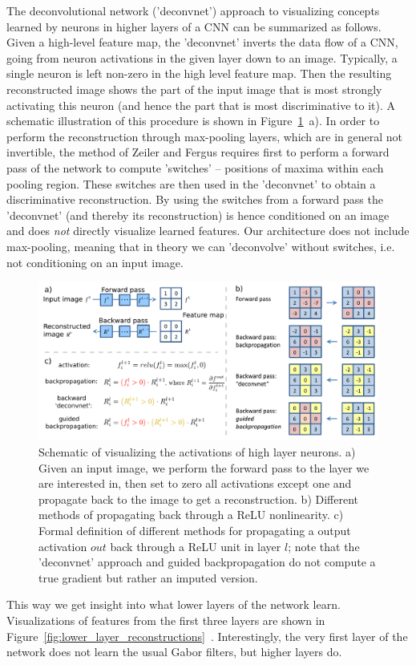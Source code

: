 \documentclass{article} %
\begin{document}
The deconvolutional network ('deconvnet') approach to visualizing concepts learned by neurons in higher layers of a CNN can be summarized as follows. Given a high-level feature map, the 'deconvnet' inverts the data flow of a CNN, going from neuron activations in the given layer down to an image. Typically, a single neuron is left non-zero in the high level feature map. Then the resulting reconstructed image shows the part of the input image that is most strongly activating this neuron (and hence the part that is most discriminative to it). A schematic illustration of this procedure is shown in Figure~\ref{fig:scheme_deconv}~a).
%
In order to perform the reconstruction through max-pooling layers, which are in general not invertible, the method of Zeiler and Fergus requires first to perform a forward pass of the network to compute 'switches' -- positions of maxima within each pooling region. These switches are then used in the 'deconvnet' to obtain a discriminative reconstruction. By using the switches from a forward pass the 'deconvnet' (and thereby its reconstruction) is hence conditioned on an image and does \emph{not} directly visualize learned features. Our architecture does not include max-pooling, meaning that in theory we can 'deconvolve' without switches, i.e. not conditioning on an input image. 
\begin{figure}[h!]
\begin{center}
\includegraphics[width=.7\textwidth]{scheme_recons.pdf}
\end{center}
\caption{Schematic of visualizing the activations of high layer
  neurons. a) Given an input image, we perform the forward pass to the
  layer we are interested in, then set to zero all activations except
  one and propagate back to the image to get a reconstruction. b)
  Different methods of propagating back through a ReLU
  nonlinearity. c) Formal definition of different methods for
  propagating a output activation $out$ back through a ReLU unit in
  layer $l$; note that the 'deconvnet' approach and guided backpropagation 
  do not compute a true gradient but rather an imputed version.}
\label{fig:scheme_deconv}
\end{figure}This way we get insight into what lower layers of the network learn. Visualizations of features from the first three layers are shown in Figure~\ref{fig:lower_layer_reconstructions}~. Interestingly, the very first layer of the network does not learn the usual Gabor filters, but higher layers do. 
\end{document}
